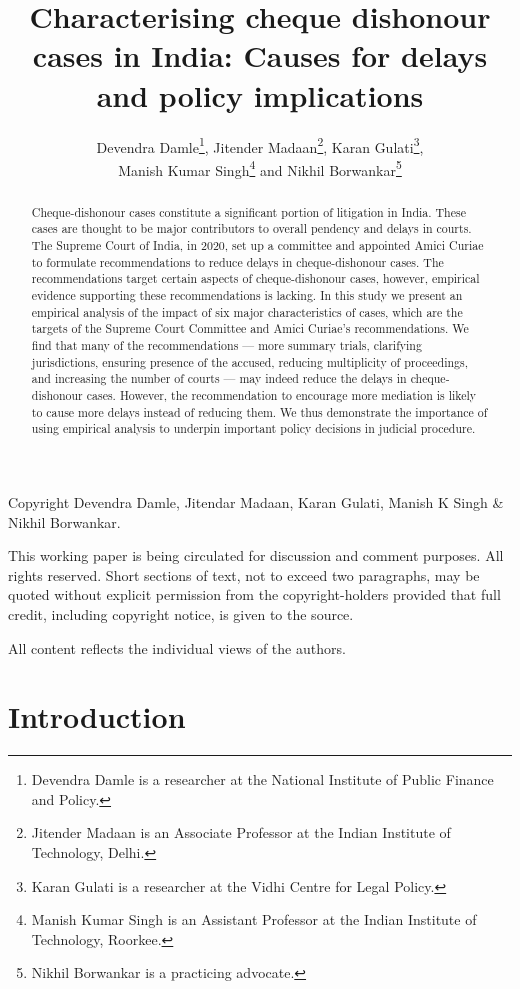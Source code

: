 \documentclass[12pt,a4paper]{article}
\title{Characterising cheque dishonour cases in India: Causes for delays and policy implications}
\author{Devendra Damle\thanks{Devendra Damle is a researcher at the National Institute of Public Finance and Policy.}, Jitender Madaan\thanks{Jitender Madaan is an Associate Professor at the Indian Institute of Technology, Delhi.}, Karan Gulati\thanks{Karan Gulati is a researcher at the Vidhi Centre for Legal Policy.},\\ Manish Kumar Singh\thanks{Manish Kumar Singh is an Assistant Professor at the Indian Institute of Technology, Roorkee.} and Nikhil Borwankar\thanks{Nikhil Borwankar is a practicing advocate.}}
\begin{document}
\maketitle

\begin{abstract}
Cheque-dishonour cases constitute a significant portion of litigation in India. These cases are thought to be major contributors to overall pendency and delays in courts. The Supreme Court of India, in 2020, set up a committee and appointed Amici Curiae to formulate recommendations to reduce delays in cheque-dishonour cases. The recommendations target certain aspects of cheque-dishonour cases, however, empirical evidence supporting these recommendations is lacking. In this study we present an empirical analysis of the impact of six major characteristics of cases, which are the targets of the Supreme Court Committee and Amici Curiae's recommendations. We find that many of the recommendations --- more summary trials, clarifying jurisdictions, ensuring presence of the accused, reducing multiplicity of proceedings, and increasing the number of courts --- may indeed reduce the delays in cheque-dishonour cases. However, the recommendation to encourage more mediation is likely to cause more delays instead of reducing them. We thus demonstrate the importance of using empirical analysis to underpin important policy decisions in judicial procedure.
\end{abstract}

\newpage

Copyright Devendra Damle, Jitendar Madaan, Karan Gulati, Manish K Singh \& Nikhil Borwankar.

This working paper is being circulated for discussion and comment purposes. All rights reserved. Short sections of text, not to exceed two paragraphs, may be quoted without explicit permission from the copyright-holders provided that full credit, including copyright notice, is given to the source.

All content reflects the individual views of the authors.

\newpage
\tableofcontents

\newpage
\printglossaries

\newpage
\listoftables

\newpage
\section{Introduction}
\label{sec:introduction}

\end{document}
